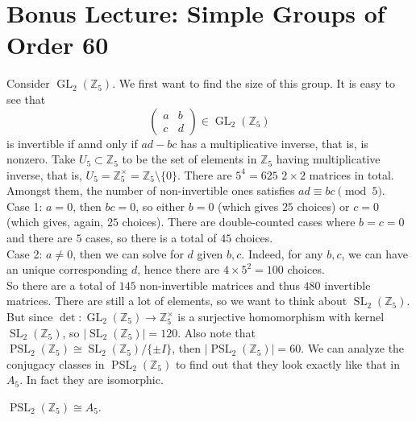 \section{Bonus Lecture: Simple Groups of Order 60}
Consider $\operatorname{GL}_2(\mathbb Z_5)$.
We first want to find the size of this group.
It is easy to see that
$$\begin{pmatrix}
    a&b\\
    c&d
\end{pmatrix}\in\operatorname{GL}_2(\mathbb Z_5)$$
is invertible if annd only if $ad-bc$ has a multiplicative inverse, that is, is nonzero.
Take $U_5\subset \mathbb Z_5$ to be the set of elements in $\mathbb Z_5$ having multiplicative inverse, that is, $U_5=\mathbb Z_5^\times=\mathbb Z_5\setminus\{0\}$.
There are $5^4=625$ $2\times 2$ matrices in total.
Amongst them, the number of non-invertible ones satisfies $ad\equiv bc\pmod{5}$.\\
Case 1: $a=0$, then $bc=0$, so either $b=0$ (which gives $25$ choices) or $c=0$ (which gives, again, $25$ choices).
There are double-counted cases where $b=c=0$ and there are $5$ cases, so there is a total of $45$ choices.\\
Case 2: $a\neq 0$, then we can solve for $d$ given $b,c$.
Indeed, for any $b,c$, we can have an unique corresponding $d$, hence there are $4\times 5^2=100$ choices.\\
So there are a total of $145$ non-invertible matrices and thus $480$ invertible matrices.
There are still a lot of elements, so we want to think about $\operatorname{SL}_2(\mathbb Z_5)$.
But since $\det:\operatorname{GL}_2(\mathbb Z_5)\to\mathbb Z_5^\times$ is a surjective homomorphism with kernel $\operatorname{SL}_2(\mathbb Z_5)$, so $|\operatorname{SL}_2(\mathbb Z_5)|=120$.
Also note that $\operatorname{PSL}_2(\mathbb Z_5)\cong\operatorname{SL}_2(\mathbb Z_5)/\{\pm I\}$, then $|\operatorname{PSL}_2(\mathbb Z_5)|=60$.
We can analyze the conjugacy classes in $\operatorname{PSL}_2(\mathbb Z_5)$ to find out that they look exactly like that in $A_5$.
In fact they are isomorphic.
\begin{theorem}
    $\operatorname{PSL}_2(\mathbb Z_5)\cong A_5$.
\end{theorem}
